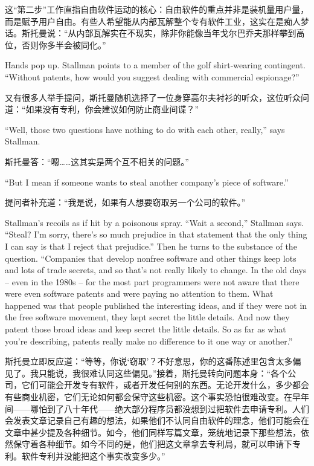 \ifdefined\chs
这``第二步''工作直指自由软件运动的核心：自由软件的重点并非是装机量用户量，而是赋予用户自由。有些人希望能从内部瓦解整个专有软件工业，这实在是痴人梦话。斯托曼说：``从内部瓦解实在不现实，除非你能像当年戈尔巴乔夫那样攀到高位，否则你多半会被同化。''
\fi

\ifdefined\eng
Hands pop up. Stallman points to a member of the golf shirt-wearing contingent. ``Without patents, how would you suggest dealing with commercial espionage?''
\fi

\ifdefined\chs
又有很多人举手提问，斯托曼随机选择了一位身穿高尔夫衬衫的听众，这位听众问道：``如果没有专利，你会建议如何防止商业间谍？''
\fi

\ifdefined\eng
``Well, those two questions have nothing to do with each other, really,'' says Stallman.
\fi

\ifdefined\chs
斯托曼答：``嗯……这其实是两个互不相关的问题。''
\fi

\ifdefined\eng
``But I mean if someone wants to steal another company's piece of software.''
\fi

\ifdefined\chs
提问者补充道：``我是说，如果有人想要窃取另一个公司的软件。''
\fi

\ifdefined\eng
Stallman's recoils as if hit by a poisonous spray. ``Wait a second,'' Stallman says. ``Steal? I'm sorry, there's so much prejudice in that statement that the only thing I can say is that I reject that prejudice.\ifdefined\vtwo '' Then he turns to the substance of the question. ``\fi Companies that develop nonfree software and other things keep lots and lots of trade secrets, and so that's not really likely to change. In the old days -- even in the 1980s -- for the most part programmers were not aware that there were even software patents and were paying no attention to them. What happened was that people published the interesting ideas, and if they were not in the free software movement, they kept secret the little details. And now they patent those broad ideas and keep secret the little details. So as far as what you're describing, patents really make no difference to it one way or another.''
\fi

\ifdefined\chs
斯托曼立即反应道：``等等，你说`窃取'？不好意思，你的这番陈述里包含太多偏见了。我只能说，我很难认同这些偏见。\ifdefined\vtwo ''接着，斯托曼转向问题本身：``\fi 各个公司，它们可能会开发专有软件，或者开发任何别的东西。无论开发什么，多少都会有些商业机密，它们无论如何都会保守这些机密。这个事实恐怕很难改变。在早年间——哪怕到了八十年代——绝大部分程序员都没想到过把软件去申请专利。人们会发表文章记录自己有趣的想法，如果他们不认同自由软件的理念，他们可能会在文章中甚少提及各种细节。如今，他们同样写篇文章，笼统地记录下那些想法，依然保守着各种细节。如今不同的是，他们把这文章拿去专利局，就可以申请下专利。软件专利并没能把这个事实改变多少。''
\fi

